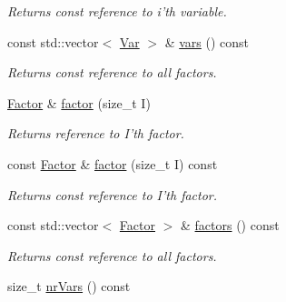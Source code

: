 \begin{CompactItemize}
\begin{CompactList}\small\item\em Returns const reference to i'th variable. \item\end{CompactList}\item 
\hypertarget{classdai_1_1FactorGraph_4e82ddbe1e2ca8a58bc7aec4d9fa61b6}{
const std::vector$<$ \hyperlink{classdai_1_1Var}{Var} $>$ \& \hyperlink{classdai_1_1FactorGraph_4e82ddbe1e2ca8a58bc7aec4d9fa61b6}{vars} () const }
\label{classdai_1_1FactorGraph_4e82ddbe1e2ca8a58bc7aec4d9fa61b6}

\begin{CompactList}\small\item\em Returns const reference to all factors. \item\end{CompactList}\item 
\hypertarget{classdai_1_1FactorGraph_4f73bace8b2ecd16654116467f38045b}{
\hyperlink{classdai_1_1TFactor}{Factor} \& \hyperlink{classdai_1_1FactorGraph_4f73bace8b2ecd16654116467f38045b}{factor} (size\_\-t I)}
\label{classdai_1_1FactorGraph_4f73bace8b2ecd16654116467f38045b}

\begin{CompactList}\small\item\em Returns reference to I'th factor. \item\end{CompactList}\item 
\hypertarget{classdai_1_1FactorGraph_9a930964b0d006bb0d6ace88fb1da481}{
const \hyperlink{classdai_1_1TFactor}{Factor} \& \hyperlink{classdai_1_1FactorGraph_9a930964b0d006bb0d6ace88fb1da481}{factor} (size\_\-t I) const }
\label{classdai_1_1FactorGraph_9a930964b0d006bb0d6ace88fb1da481}

\begin{CompactList}\small\item\em Returns const reference to I'th factor. \item\end{CompactList}\item 
\hypertarget{classdai_1_1FactorGraph_35030e580fdcab5abd877f0e0bd883d5}{
const std::vector$<$ \hyperlink{classdai_1_1TFactor}{Factor} $>$ \& \hyperlink{classdai_1_1FactorGraph_35030e580fdcab5abd877f0e0bd883d5}{factors} () const }
\label{classdai_1_1FactorGraph_35030e580fdcab5abd877f0e0bd883d5}

\begin{CompactList}\small\item\em Returns const reference to all factors. \item\end{CompactList}\item 
\hypertarget{classdai_1_1FactorGraph_107d707b4ef22d83f19c40989c227d5d}{
size\_\-t \hyperlink{classdai_1_1FactorGraph_107d707b4ef22d83f19c40989c227d5d}{nrVars} () const }
\label{classdai_1_1FactorGraph_107d707b4ef22d83f19c40989c227d5d}


\end{CompactItemize}
